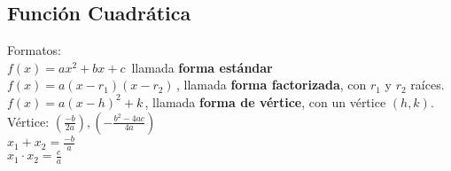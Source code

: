 \subsection{Función Cuadrática}
Formatos:\\
$f(x) = a x^2 + b x + c \,\!$ llamada \textbf{forma estándar}\\
$f(x) = a(x - r_1)(x - r_2)\,\!$, llamada \textbf{forma factorizada}, con $r_1$ y $r_2$ raíces.\\
$f(x) = a(x - h)^2 + k \,\!$, llamada \textbf{forma de vértice}, con un vértice $(h, k)$.\\

Vértice: $(\frac{-b}{2a}),(-\frac{b^2-4ac}{4a})$\\
$x_1 + x_2 = \frac{-b}{a}$\\
$x_1 \cdot x_2 = \frac{c}{a}$\\